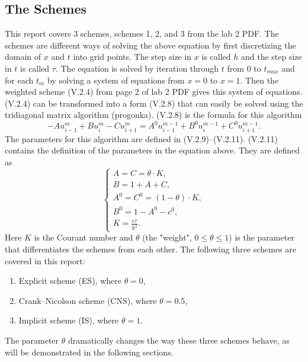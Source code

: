 \documentclass[a4paper, 12pt, reqno]{article}
\begin{document}
\subsection{The Schemes}

This report covers 3 schemes, schemes 1, 2, and 3 from the lab 2 PDF. The
schemes are different ways of solving the above equation by first discretizing
the domain of $x$ and $t$ into grid points. The step size in $x$ is called $h$
and the step size in $t$ is called $\tau$. The equation is solved by iteration
through $t$ from $0$ to $t_{max}$ and for each $t_m$ by solving a system of
equations from $x=0$ to $x=1$. Then the weighted scheme (V.2.4)
from page 2 of lab 2 PDF gives this system of equations. (V.2.4) can be
transformed into a form (V.2.8) that can easily be solved using the tridiagonal
matrix algorithm (progonka). (V.2.8) is the formula for this algorithm
\begin{equation}\nonumber
    -Au^m_{i-1} + Bu_i^m - Cu^m_{i+1} = 
        A^0u^{m-1}_{i-1} + B^0u_i^{m-1} + C^0u^{m-1}_{i+1}.
\end{equation}
The parameters for this algorithm are defined in (V.2.9)--(V.2.11). (V.2.11)
contains the definition of the parameters in the equation above. They are
defined as
\begin{equation}\nonumber
    \begin{cases}
        A = C = \theta \cdot K, \\
        B = 1 + A + C,\\
        A^0 = C^0 = (1-\theta) \cdot K, \\
        B^0 = 1 - A^0 - c^0, \\
        K = \frac{\epsilon \tau}{h^2}.
    \end{cases}
\end{equation}
Here $K$ is the Courant number and $\theta$ (the "weight", $0 \le \theta \le 1$) is the parameter that
differentiates the schemes from each other. The following three schemes are
covered in this report:
\begin{enumerate}
    \item Explicit scheme (ES), where $\theta = 0$,
    \item Crank--Nicolson scheme (CNS), where $\theta = 0.5$,
    \item Implicit scheme (IS), where $\theta = 1$.
\end{enumerate}
The parameter $\theta$ dramatically changes the way these three schemes behave,
as will be demonstrated in the following sections.
\end{document}
